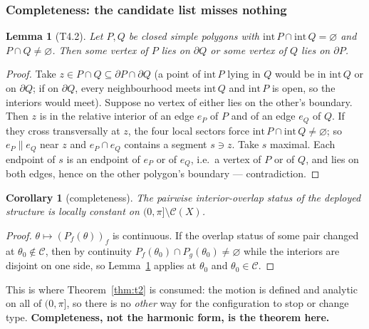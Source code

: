 \documentclass[11pt,a4paper]{article}
\newtheorem{lemma}[theorem]{Lemma}
\newtheorem{corollary}[theorem]{Corollary}
\theoremstyle{definition}
\begin{document}
\subsubsection{Completeness: the candidate list misses nothing}

\begin{lemma}[T4.2]
\label{lem:t42}
Let $P,Q$ be closed simple polygons with $\mathrm{int}\,P\cap\mathrm{int}\,Q=\varnothing$ and
$P\cap Q\ne\varnothing$. Then some vertex of $P$ lies on $\partial Q$ or some vertex of $Q$
lies on $\partial P$.
\end{lemma}
\begin{proof}
Take $z\in P\cap Q\subseteq\partial P\cap\partial Q$ (a point of $\mathrm{int}\,P$ lying in
$Q$ would be in $\mathrm{int}\,Q$ or on $\partial Q$; if on $\partial Q$, every neighbourhood
meets $\mathrm{int}\,Q$ and $\mathrm{int}\,P$ is open, so the interiors would meet).
Suppose no vertex of either lies on the other's boundary. Then $z$ is in the relative
interior of an edge $e_P$ of $P$ and of an edge $e_Q$ of $Q$. If they cross transversally at
$z$, the four local sectors force $\mathrm{int}\,P\cap\mathrm{int}\,Q\ne\varnothing$; so
$e_P\parallel e_Q$ near $z$ and $e_P\cap e_Q$ contains a segment $s\ni z$. Take $s$ maximal.
Each endpoint of $s$ is an endpoint of $e_P$ or of $e_Q$, i.e.\ a vertex of $P$ or of $Q$,
and lies on both edges, hence on the other polygon's boundary --- contradiction.
\end{proof}

\begin{corollary}[completeness]
\label{cor:complete}
The pairwise interior-overlap status of the deployed structure is locally constant on
$(0,\pi]\setminus\mathcal{C}(X)$.
\end{corollary}
\begin{proof}
$\theta\mapsto(P_f(\theta))_f$ is continuous. If the overlap status of some pair changed at
$\theta_0\notin\mathcal{C}$, then by continuity $P_f(\theta_0)\cap P_g(\theta_0)\ne\varnothing$
while the interiors are disjoint on one side, so Lemma~\ref{lem:t42} applies at $\theta_0$ and
$\theta_0\in\mathcal{C}$.
\end{proof}

\noindent This is where Theorem~\ref{thm:t2} is consumed: the motion is defined and analytic
on all of $(0,\pi]$, so there is no \emph{other} way for the configuration to stop or change
type. \textbf{Completeness, not the harmonic form, is the theorem here.}
\end{document}
